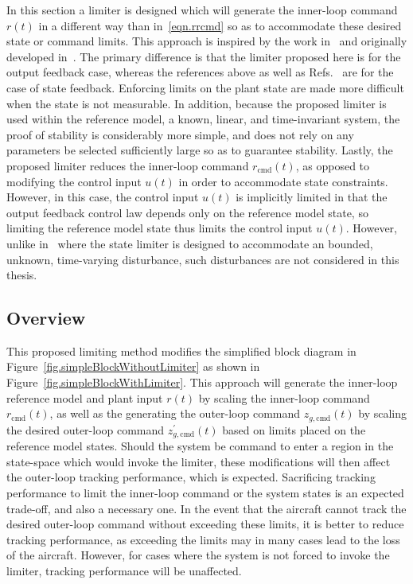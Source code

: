In this section a limiter is designed which will generate the inner-loop command $r(t)$ in a different way than in\ \eqref{eqn.rrcmd} so as to accommodate these desired state or command limits.
This approach is inspired by the work in\ \cite{gadient.statelimter.2011, lavretsky.statelimiting.2010, lavretskywise.book.2013} and originally developed in\ \cite{sanner.gaussian.1992}.
The primary difference is that the limiter proposed here is for the output feedback case, whereas the references above as well as Refs.\ \cite{famularo.stateconstraints.2016, muse.statecontstraints.2011} are for the case of state feedback.
Enforcing limits on the plant state are made more difficult when the state is not measurable.
In addition, because the proposed limiter is used within the reference model, a known, linear, and time-invariant system, the proof of stability is considerably more simple, and does not rely on any parameters be selected sufficiently large so as to guarantee stability.
Lastly, the proposed limiter reduces the inner-loop command $r_{\text{cmd}}(t)$, as opposed to modifying the control input $u(t)$ in order to accommodate state constraints.
However, in this case, the control input $u(t)$ is implicitly limited in that the output feedback control law depends only on the reference model state, so limiting the reference model state thus limits the control input $u(t)$.
However, unlike in\ \cite{lavretskywise.book.2013} where the state limiter is designed to accommodate an bounded, unknown, time-varying disturbance, such disturbances are not considered in this thesis.

\subsection{Overview}

This proposed limiting method modifies the simplified block diagram in Figure~\ref{fig.simpleBlockWithoutLimiter} as shown in Figure~\ref{fig.simpleBlockWithLimiter}.
This approach will generate the inner-loop reference model and plant input $r(t)$ by scaling the inner-loop command $r_{\text{cmd}}(t)$, as well as the generating the outer-loop command $z_{g,\text{cmd}}(t)$ by scaling the desired outer-loop command $z_{g,\text{cmd}}^{\prime}(t)$ based on limits placed on the reference model states.
Should the system be command to enter a region in the state-space which would invoke the limiter, these modifications will then affect the outer-loop tracking performance, which is expected.
Sacrificing tracking performance to limit the inner-loop command or the system states is an expected trade-off, and also a necessary one.
In the event that the aircraft cannot track the desired outer-loop command without exceeding these limits, it is better to reduce tracking performance, as exceeding the limits may in many cases lead to the loss of the aircraft.
However, for cases where the system is not forced to invoke the limiter, tracking performance will be unaffected.

